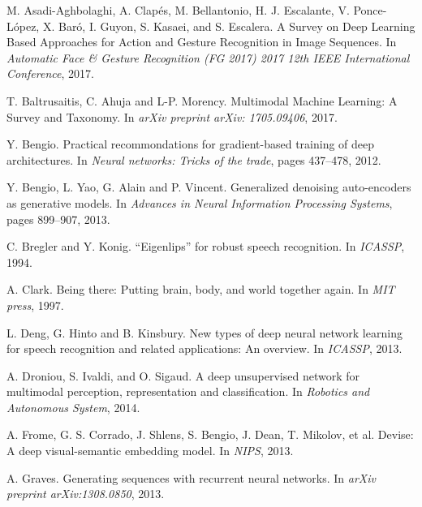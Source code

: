 

\newpage

\begin{thebibliography}{99}

{\footnotesize

  M. Asadi-Aghbolaghi, A. Clapés, M. Bellantonio, H. J. Escalante, 
  V. Ponce-López, X. Baró, I. Guyon, S. Kasaei, and S. Escalera. 
  A Survey on Deep Learning Based Approaches for Action and Gesture 
  Recognition in Image Sequences. 
  In \textit{Automatic Face \& Gesture Recognition (FG 2017) 2017 12th IEEE
  International Conference}, 2017.

  T. Baltrusaitis, C. Ahuja and L-P. Morency. Multimodal Machine Learning:
  A Survey and Taxonomy. In \textit{arXiv preprint arXiv: 1705.09406}, 2017.

  Y. Bengio. Practical recommondations for gradient-based training of deep
  architectures. In \textit{Neural networks: Tricks of the trade},
  pages 437--478, 2012.

  Y. Bengio, L. Yao, G. Alain and P. Vincent. Generalized denoising
  auto-encoders as generative models. In \textit{Advances in Neural
  Information Processing Systems}, pages 899--907, 2013.

  C. Bregler and Y. Konig. ``Eigenlips'' for robust speech recognition.
  In \textit{ICASSP}, 1994.

  A. Clark. Being there: Putting brain, body, and world together again.
  In \textit{MIT press}, 1997.

  L. Deng, G. Hinto and B. Kinsbury. New types of deep neural network
  learning for speech recognition and related applications: An overview.
  In \textit{ICASSP}, 2013.

  A. Droniou, S. Ivaldi, and O. Sigaud. A deep unsupervised network
  for multimodal perception, representation and classification. In
  \textit{Robotics and Autonomous System}, 2014.

  A. Frome, G. S. Corrado, J. Shlens, S. Bengio, J. Dean,
  T. Mikolov, et al. Devise: A deep visual-semantic embedding model. 
  In \textit{NIPS}, 2013.

  A. Graves. Generating sequences with recurrent neural networks.
  In \textit{arXiv preprint arXiv:1308.0850}, 2013.

}
\end{thebibliography}
